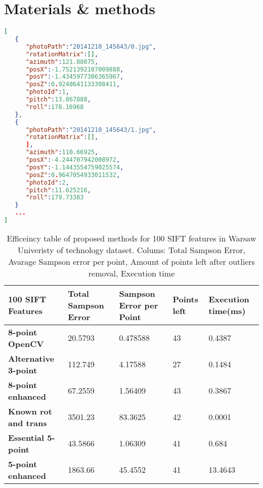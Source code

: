 

\chapter{Materials \& methods} %
\begin{lstlisting}[language=json,firstnumber=1, float]
[
   {
      "photoPath":"20141210_145643/0.jpg",
      "rotationMatrix":[],
      "azimuth":121.88075,
      "posX":-1.7521392107009888,
      "posY":-1.4345977306365967,
      "posZ":0.9248641133308411,
      "photoId":1,
      "pitch":13.867888,
      "roll":178.16968
   },
   {
      "photoPath":"20141210_145643/1.jpg",
      "rotationMatrix":[],
      ],
      "azimuth":110.66925,
      "posX":-4.244707942008972,
      "posY":-1.1443554759025574,
      "posZ":0.9647054933011532,
      "photoId":2,
      "pitch":11.625216,
      "roll":179.73383
   }
   ...
]
\end{lstlisting}
\clearpage

\begin{table}[h]
\centering
\begin{adjustbox}{width=1\linewidth}
\begin{tabular}{l|l|l|l|l}
\textbf{100 SIFT Features}   & \textbf{Total Sampson Error} & \textbf{Sampson Error per Point} & \textbf{Points left} & \textbf{Execution time(ms)} \\ \hline
\textbf{8-point OpenCV}      & 20.5793             & 0.478588                & 43          & 0.4387             \\ \hline
\textbf{Alternative 3-point} & 112.749             & 4.17588                 & 27          & 0.1484             \\ \hline
\textbf{8-point enhanced}    & 67.2559             & 1.56409                 & 43          & 0.3867             \\ \hline
\textbf{Known rot and trans} & 3501.23             & 83.3625                 & 42          & 0.0001             \\ \hline
\textbf{Essential 5-point}   & 43.5866             & 1.06309                 & 41          & 0.684              \\ \hline
\textbf{5-point enhanced}    & 1863.66             & 45.4552                 & 41          & 13.4643            \\
\end{tabular}
\end{adjustbox}
\caption{Efficeincy table of proposed methods for 100 SIFT features in Warsaw Univeristy of technology dataset. Colums: Total Sampson Error, Avarage Sampson error per point, Amount of points left after outliers removal, Execution time}
\label{table:Efficiency100Sift}
\end{table}


